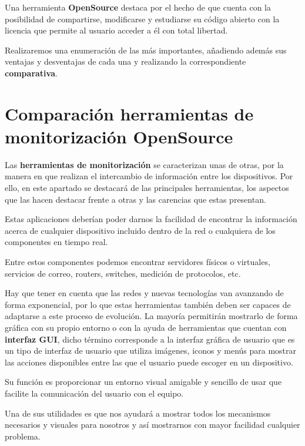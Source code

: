 Una herramienta \textbf{OpenSource} destaca por el hecho de que cuenta con la posibilidad de compartirse, modificarse y estudiarse su código abierto con la licencia que permite al usuario acceder a él con total libertad.

Realizaremos una enumeración de las más importantes, añadiendo además sus ventajas y desventajas de cada una y realizando la correspondiente \textbf{comparativa}.
\section{Comparación herramientas de monitorización OpenSource}
Las \textbf{herramientas de monitorización} se caracterizan unas de otras, por la manera en que realizan el intercambio de información entre los dispositivos. Por ello, en este apartado se destacará de las principales herramientas, los aspectos que las hacen destacar frente a otras y las carencias que estas presentan.

Estas aplicaciones deberían poder darnos la facilidad de encontrar la información acerca de cualquier dispositivo incluido dentro de la red o cualquiera de los componentes en tiempo real.

Entre estos componentes podemos encontrar servidores físicos o virtuales, servicios de correo, routers, switches, medición de protocolos, etc.

Hay que tener en cuenta que las redes y nuevas tecnologías van avanzando de forma exponencial, por lo que estas herramientas también deben ser capaces de adaptarse a este proceso de evolución. 
\newpage
La mayoría permitirán mostrarlo de forma gráfica con su propio entorno o con la ayuda de herramientas que cuentan con \textbf{interfaz GUI}, dicho término corresponde a la interfaz gráfica de usuario que es un tipo de interfaz de usuario que utiliza imágenes, iconos y menús para mostrar las acciones disponibles entre las que el usuario puede escoger en un dispositivo. 

Su función es proporcionar un entorno visual amigable y sencillo de usar que facilite la comunicación del usuario con el equipo.

Una de sus utilidades es que nos ayudará a mostrar todos los mecanismos necesarios y visuales para nosotros y así mostrarnos con mayor facilidad cualquier problema.

